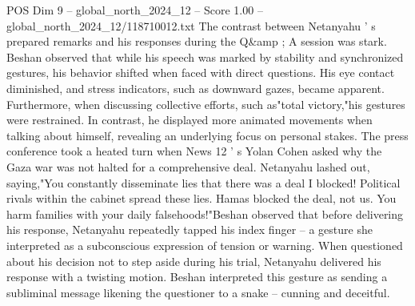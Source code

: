 \begin{textsample}{POS Dim 9 – global\_north\_2024\_12 – Score 1.00 – global\_north\_2024\_12/118710012.txt}
The contrast between Netanyahu ' s prepared remarks and his responses during the Q\&amp ; A session was stark.
Beshan observed that while his speech was marked by stability and synchronized gestures, his behavior shifted when faced with direct questions.
His eye contact diminished, and stress indicators, such as downward gazes, became apparent.
Furthermore, when discussing collective efforts, such as"total victory,"his gestures were restrained.
In contrast, he displayed more animated movements when talking about himself, revealing an underlying focus on personal stakes.
The press conference took a heated turn when News 12 ' s Yolan Cohen asked why the Gaza war was not halted for a comprehensive deal.
Netanyahu lashed out, saying,"You constantly disseminate lies that there was a deal I blocked!
Political rivals within the cabinet spread these lies.
Hamas blocked the deal, not us.
You harm families with your daily falsehoods!"Beshan observed that before delivering his response, Netanyahu repeatedly tapped his index finger -- a gesture she interpreted as a subconscious expression of tension or warning.
When questioned about his decision not to step aside during his trial, Netanyahu delivered his response with a twisting motion.
Beshan interpreted this gesture as sending a subliminal message likening the questioner to a snake -- cunning and deceitful.

\end{textsample}
